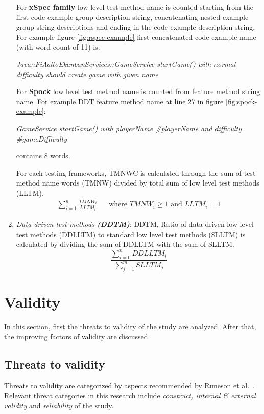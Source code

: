 \begin{addmargin}[0em]{0em}
\begin{enumerate}
    For \textbf{xSpec family} low level test method name is counted starting from the first code example group description string,
    concatenating nested example group string descriptions and ending in the code example description string.
    For example figure \ref{fig:rspec-example} first concatenated code example name (with word count of 11) is:

    \begin{center}
    \textit{Java::FiAaltoEkanbanServices::GameService startGame() with normal difficulty should create game with given name}
    \end{center}

    For \textbf{Spock} low level test method name is counted from feature method string name. For example DDT feature method name at
    line 27 in figure \ref{fig:spock-example}:
    \begin{center}
    \textit{GameService startGame() with playerName \#playerName and difficulty \#gameDifficulty}
    \end{center}
    contains 8 words.

    For each testing frameworks, TMNWC is calculated through the sum of test method name words (TMNW) divided by total sum of low level test methods (LLTM).
    \begin{align*}
        \sum_{i=1}^{n}\frac{TMNW_{i}}{LLTM_{i}} && \text {where } TMNW_{i} \geq 1 \text{ and } LLTM_{i} = 1
    \end{align*}

    \item \textit{Data driven test methods \textbf{(DDTM)}}:
    DDTM, Ratio of data driven low level test methods (DDLLTM) to standard low level test methods (SLLTM) is calculated by dividing the sum
    of DDLLTM with the sum of SLLTM.
    \[\frac{\sum_{i=0}^{n}DDLLTM_{i}}{\sum_{j=1}^{m}SLLTM_{j}}\]
    \end{enumerate}
    \end{addmargin}

\section{Validity}
In this section, first the threats to validity of the study are analyzed. After that, the improving factors of validity
are discussed.

\subsection{Threats to validity}
Threats to validity are categorized by aspects recommended by Runeson et al.~\cite{runeson2012case}. Relevant threat categories in
this research include \textit{construct, internal \& external validity} and \textit{reliability} of the study.

